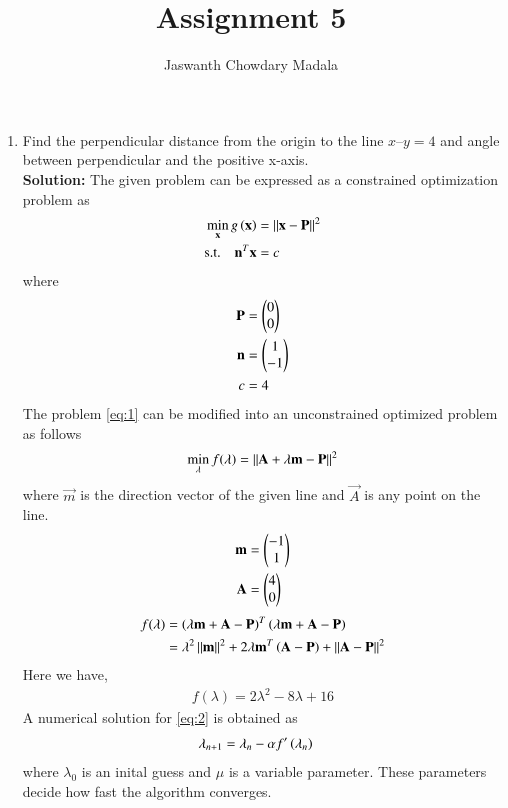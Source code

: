 \documentclass[journal,12pt,twocolumn]{IEEEtran}
\begin{document}
\vspace{3cm}


\title{Assignment 5}
\author{Jaswanth Chowdary Madala}


\maketitle

\newpage


\bigskip

\renewcommand{\thefigure}{\theenumi}
\renewcommand{\thetable}{\theenumi}

\begin{enumerate}
\item Find the perpendicular distance from the origin to the line $x – y = 4$ and angle between perpendicular and the positive x-axis.\\
\textbf{Solution:} The given problem can be expressed as a constrained optimization problem as 
\begin{align}
	\min_{\mathbf{x}}g\left(\mathbf{x}\right) &= \left\lVert\mathbf{x}-\mathbf{P}\right\rVert^2 \label{eq:1} \\
	\text{s.t.} \quad \mathbf{n}^T\mathbf{x} &= c
\end{align}
where
\begin{align}
	\mathbf{P} &= \begin{pmatrix}0\\0\end{pmatrix}\\
	\mathbf{n} &= \begin{pmatrix}1\\-1\end{pmatrix}\\
	c &= 4
\end{align}
The problem \eqref{eq:1} can be modified into an unconstrained optimized problem as follows
\begin{align}
\min_{\lambda}f(\lambda) = \left\lVert\mathbf{A} + \lambda \mathbf{m}-\mathbf{P}\right\rVert^2 \label{eq:2}
\end{align}
where $\vec{m}$ is the direction vector of the given line and $\vec{A}$ is any point on the line.
\begin{align}
\mathbf{m} &= \begin{pmatrix}-1 \\ 1\end{pmatrix}\\
\mathbf{A} &= \begin{pmatrix}4 \\ 0\end{pmatrix}
\end{align}
\begin{align}
f(\lambda) & = \left( \lambda \mathbf{m}+\mathbf{A} -\mathbf{P}\right)^T \left( \lambda \mathbf{m}+\mathbf{A} -\mathbf{P}\right) \\
&= \lambda^2 \left\lVert\mathbf{m}\right\rVert^2 +2\lambda \mathbf{m}^T\left(\mathbf{A} -\mathbf{P}\right) + \left\lVert\mathbf{A} -\mathbf{P}\right\rVert^2
\end{align}
Here we have,
\begin{align}
f(\lambda) = 2\lambda^2 -8\lambda + 16 \label{eq:3}
\end{align}
A numerical solution for \eqref{eq:2} is obtained as
\begin{align}
\lambda_{n+1}&=\lambda_{n}-\alpha f^{\prime}\left(\lambda_n\right)
\end{align}
where $\lambda_0$ is an inital guess and $\mu$ is a variable parameter. These parameters decide how fast the algorithm converges.


\end{enumerate}
\end{document}

